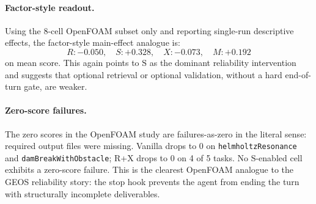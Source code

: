 \documentclass{article}
\begin{document}
\paragraph{Factor-style readout.}
Using the 8-cell OpenFOAM subset only and reporting single-run descriptive effects, the factor-style main-effect analogue is:
\[
R: -0.050,\quad
S: +0.328,\quad
X: -0.073,\quad
M: +0.192
\]
on mean score. This again points to $\mathrm{S}$ as the dominant reliability intervention and suggests that optional retrieval or optional validation, without a hard end-of-turn gate, are weaker.

\begin{table}[t]
  \caption{Per-task OpenFOAM transfer-study scores. The catastrophic failures are concentrated in non-$\mathrm{S}$ cells, especially Vanilla and R+X.}
  \label{tab:openfoam-per-task}
  \centering
  \footnotesize
\end{table}

\paragraph{Zero-score failures.}
The zero scores in the OpenFOAM study are failures-as-zero in the literal sense: required output files were missing. Vanilla drops to 0 on \texttt{helmholtzResonance} and \texttt{damBreakWithObstacle}; R+X drops to 0 on 4 of 5 tasks. No $\mathrm{S}$-enabled cell exhibits a zero-score failure. This is the clearest OpenFOAM analogue to the GEOS reliability story: the stop hook prevents the agent from ending the turn with structurally incomplete deliverables.
\end{document}
